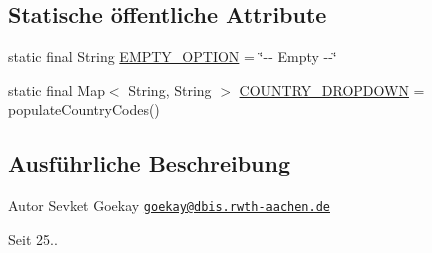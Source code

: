 \subsection*{Statische öffentliche Attribute}
\begin{DoxyCompactItemize}
\item 
static final String \hyperlink{classde_1_1rwth_1_1idsg_1_1steve_1_1utils_1_1_controller_helper_a109b68c4123f4c253f29673721e3382b}{E\+M\+P\+T\+Y\+\_\+\+O\+P\+T\+I\+O\+N} = \char`\"{}-\/-\/ Empty -\/-\/\char`\"{}
\item 
static final Map$<$ String, String $>$ \hyperlink{classde_1_1rwth_1_1idsg_1_1steve_1_1utils_1_1_controller_helper_a708225bcb0a143ff18ee9a73f51bc433}{C\+O\+U\+N\+T\+R\+Y\+\_\+\+D\+R\+O\+P\+D\+O\+W\+N} = populate\+Country\+Codes()
\end{DoxyCompactItemize}


\subsection{Ausführliche Beschreibung}
\begin{DoxyAuthor}{Autor}
Sevket Goekay \href{mailto:goekay@dbis.rwth-aachen.de}{\tt goekay@dbis.\+rwth-\/aachen.\+de} 
\end{DoxyAuthor}
\begin{DoxySince}{Seit}
25.. 
\end{DoxySince}


